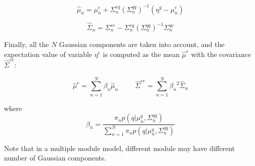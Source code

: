 \begin{table}
{\begin{minipage}[t]{0.45\textwidth}
            \begin{equation}
            {
            \hat{\mu}_{n} = {\mu}_{n}^e + \Sigma_{n}^{eq}({\Sigma}_{n}^{qq})^{-1}(\eta^q-{\mu}_{n}^e)
            }
            \end{equation}

            \begin{equation}
            {
            \hat{\Sigma}_{n} = {\Sigma}_{n}^{ee} - {\Sigma}_{n}^{eq}({\Sigma}_{n}^{qq})^{-1}{\Sigma}_{n}^{qe}
            }
            \end{equation}


            Finally, all the $N$ Gaussian components are taken into
            account, and the expectation value of variable $\eta^e$ is
            computed as the mean $\hat{\mu}^e$ with the covariance
            $\hat{\Sigma}^{ee}$:

            \begin{equation}
            {
            \hat{\mu}^{e} = \sum_{n=1}^N{\beta_n}\hat{\mu}_{n}
            }
            \hspace{1cm}
            {
            \hat{\Sigma}^{ee} = \sum_{n=1}^N{\beta_n}^2\hat{\Sigma}_{n}
            }
            \end{equation}


            where
            \begin{equation}
            {
            \beta_n = \frac{\pi_{n}p(q|{\mu}_{n}^q,{\Sigma}_{n}^{qq})}
            {\sum_{n=1}^N{\pi_n}p(q|{\mu}_{n}^q,{\Sigma}_{n}^{qq})}
            }
            \end{equation}

            Note that in a multiple module model, different module may have different number of Gaussian components.
        \end{minipage}
    }

\label{tab:GMM}
\end{table}



